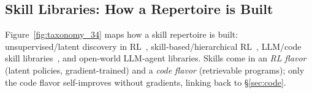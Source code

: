 \subsection{Skill Libraries: How a Repertoire is Built}
\label{sec:skill}

Figure~\ref{fig:taxonomy_34} maps how a skill repertoire is built: unsupervised/latent
discovery in RL~\citep{diayn}, skill-based/hierarchical RL~\citep{spirl},
LLM/code skill libraries~\citep{voyager}, and open-world LLM-agent libraries.
Skills come in an \emph{RL flavor} (latent policies, gradient-trained) and a \emph{code
flavor} (retrievable programs); only the code flavor self-improves without gradients,
linking back to \S\ref{sec:code}.


